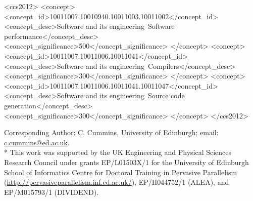 %
%
\begin{CCSXML}
<ccs2012>
    <concept>
        <concept_id>10011007.10010940.10011003.10011002</concept_id>
        <concept_desc>Software and its engineering~Software performance</concept_desc>
        <concept_significance>500</concept_significance>
    </concept>
    <concept>
        <concept_id>10011007.10011006.10011041</concept_id>
        <concept_desc>Software and its engineering~Compilers</concept_desc>
        <concept_significance>300</concept_significance>
    </concept>
    <concept>
        <concept_id>10011007.10011006.10011041.10011047</concept_id>
        <concept_desc>Software and its engineering~Source code generation</concept_desc>
        <concept_significance>300</concept_significance>
    </concept>
</ccs2012>
\end{CCSXML}


%
%




\begin{bottomstuff}
  Corresponding Author: C. Cummins, University of Edinburgh; email: \url{c.cummins@ed.ac.uk}.\\*
  This work was supported by the UK Engineering and Physical Sciences
  Research Council under grants EP/L01503X/1 for the University of
  Edinburgh School of Informatics Centre for Doctoral Training in
  Pervasive Parallelism
  (\url{http://pervasiveparallelism.inf.ed.ac.uk/}), EP/H044752/1
  (ALEA), and EP/M015793/1 (DIVIDEND).
\end{bottomstuff}

\maketitle


